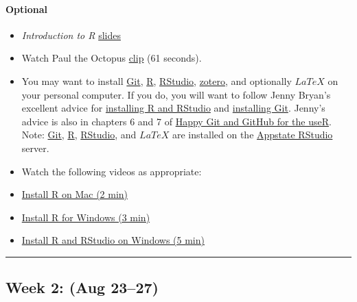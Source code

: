 \documentclass[
]{article}
\begin{document}
\begin{rmdoptional}
\hypertarget{optional}{%
\paragraph*{Optional}\label{optional}}

\begin{itemize}
\item
  \emph{Introduction to R}
  \href{https://alanarnholt.github.io/GeneralStatistics/rmarkdown/IntroToR.html}{slides}
\item
  Watch Paul the Octopus
  \href{https://www.youtube.com/watch?v=3ESGpRUMj9E}{clip} (61 seconds).
\item
  You may want to install \href{http://git-scm.com/downloads}{Git},
  \href{http://cran.r-project.org}{R},
  \href{http://www.rstudio.com/products/rstudio/download/}{RStudio},
  \href{https://www.zotero.org}{zotero}, and optionally
  \href{http://www.ctan.org/starter}{\(LaTeX\)} on your personal
  computer. If you do, you will want to follow Jenny Bryan's excellent
  advice for
  \href{http://stat545-ubc.github.io/block000_r-rstudio-install.html}{installing
  R and RStudio} and
  \href{http://stat545-ubc.github.io/git01_git-install.html}{installing
  Git}. Jenny's advice is also in chapters 6 and 7 of
  \href{http://happygitwithr.com/}{Happy Git and GitHub for the useR}.
  Note: \href{http://git-scm.com/downloads}{Git},
  \href{http://cran.r-project.org}{R},
  \href{http://www.rstudio.com/products/rstudio/download/}{RStudio}, and
  \href{http://www.ctan.org/starter}{\(LaTeX\)} are installed on the
  \href{https://mathr.math.appstate.edu/}{Appstate RStudio} server.
\item
  Watch the following videos as appropriate:
\item
  \href{https://www.youtube.com/watch?v=lJxVRgiX-ik}{Install R on Mac (2
  min)}
\item
  \href{https://www.youtube.com/watch?v=LII6of-5Odw}{Install R for
  Windows (3 min)}
\item
  \href{https://www.youtube.com/watch?v=eD07NznguA4}{Install R and
  RStudio on Windows (5 min)}
\end{itemize}
\end{rmdoptional}

\begin{center}\rule{0.5\linewidth}{0.5pt}\end{center}

\hypertarget{week-2-aug-2327}{%
\subsection*{Week 2: (Aug 23--27)}\label{week-2-aug-2327}}
\end{document}
